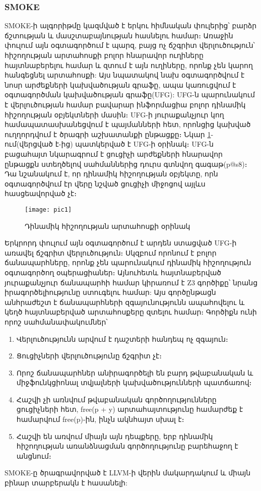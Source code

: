 \subsubsection{SMOKE}
SMOKE\cite{Fan2019}-ի ալգորիթմը կազմված է երկու հիմնական փուլերից՝ բարձր ճշտության և մասշտաբայնության հասնելու համար։
Առաջին փուլում այն օգտագործում է պարզ, բայց ոչ ճշգրիտ վերլուծություն՝ հիշողության արտահոսքի բոլոր հնարավոր ուղիները
հայտնաբերելու համար և զտում է այն ուղիները, որոնք չեն կարող հանգեցնել արտահոսքի: Այս նպատակով նախ օգտագործվում է նոսր
արժեքների կախվածության գրաֆը, ապա կառուցվում է օգտագործման կախվածության գրաֆը(UFG): UFG-ն պարունակում է վերլուծության
համար բավարար ինֆորմացիա բոլոր դինամիկ հիշողության օբյեկտների մասին։ UFG-ի յուրաքանչյուր կող համապատասխանեցվում է պայմանների հետ,
որոնցից կախված ուղղորդվում է ծրագրի աշխատանքի ընթացքը։
Նկար \ref{fig:figure1}-ում(վերցված է\cite{Fan2019}-ից) պատկերված է UFG-ի օրինակ։ UFG-ն բացահայտ նկարագրում է ցուցիչի արժեքների հնարավոր
ընթացքն ստեղծելով սահմաններից դուրս գտնվող գագաթ(p@s8)։ Դա նշանակում է, որ դինամիկ հիշողության օբյեկտը, որն
օգտագործվում էր վերը նշված ցուցիչի միջոցով այլևս հասցեավորված չէ։

\begin{figure}[h]
    \centering
    \texttt{[image: pic1]}
    \caption{Դինամիկ հիշողության արտահոսքի օրինակ}
    \label{fig:figure1}
\end{figure}

Երկրորդ փուլում այն օգտագործում է արդեն ստացված UFG-ի առավել ճշգրիտ վերլուծություն։ Սկզբում որոնում է բոլոր
ճանապարհները, որոնք չեն պարունակում դինամիկ հիշողություն օգտագործող օպերացիաներ։ Այնուհետև հայտնաբերված յուրաքանչյուր
ճանապարհի համար կիրառում է Z3 գործիքը\cite{Z3}՝ նրանց իրագործելիությունը ստուգելու համար: Այս գործընթացն անհրաժեշտ է
ճանապարհների զգայունությունն ապահովելու և կեղծ հայտնաբերված արտահոսքերը զտելու համար։ Գործիքն ունի որոշ սահմանափակումներ՝
\begin{enumerate}
    \item Վերլուծությունն արվում է դաշտերի հանդեպ ոչ զգայուն։
    \item Ցուցիչների վերլուծությունը ճշգրիտ չէ։
    \item Որոշ ճանապարհներ անիրագործելի են բարդ թվաբանական և միջֆունկցիոնալ տվյալների կախվածությունների պատճառով։
    \item Հաշվի չի առնվում թվաբանական գործողությունները ցուցիչների հետ, free(p + y) արտահայտությունը համարժեք է համարվում free(p)-ին, ինչն ակնհայտ սխալ է։
    \item Հաշվի են առվում միայն այն դեպքերը, երբ դինամիկ հիշողության առանձնացման գործողությունը բարեհաջող է անցնում։
\end{enumerate}

SMOKE-ը ծրագրավորված է LLVM-ի վերին մակարդակում և միայն բինար տարբերակն է հասանելի\cite{SMOKE}:
